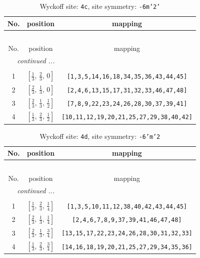 \documentclass[fleqn,8pt]{jsarticle}
\begin{document}
\renewcommand{\arraystretch}{1.2}
\begin{longtable}{ccc}
\caption{Wyckoff site: {\tt 4c}, site symmetry: {\tt -6m'2'}}
 \\
 \hline \hline
No. & position & mapping \\ \hline \endfirsthead

\multicolumn{2}{l}{\tablename\ \thetable{}} \\
 \hline \hline
No. & position & mapping \\ \hline \endhead

 \hline \hline
\multicolumn{2}{r}{\footnotesize\it continued ...} \\ \endfoot

 \hline \hline
\multicolumn{2}{r}{} \\ \endlastfoot

1 & $\left[ \frac{1}{3},\, \frac{2}{3},\, 0 \right]$ & {\tt [1,3,5,14,16,18,34,35,36,43,44,45]} \\ \hline
2 & $\left[ \frac{2}{3},\, \frac{1}{3},\, 0 \right]$ & {\tt [2,4,6,13,15,17,31,32,33,46,47,48]} \\ \hline
3 & $\left[ \frac{2}{3},\, \frac{1}{3},\, \frac{1}{2} \right]$ & {\tt [7,8,9,22,23,24,26,28,30,37,39,41]} \\ \hline
4 & $\left[ \frac{1}{3},\, \frac{2}{3},\, \frac{1}{2} \right]$ & {\tt [10,11,12,19,20,21,25,27,29,38,40,42]} \\
\end{longtable}
\renewcommand{\arraystretch}{1.2}
\begin{longtable}{ccc}
\caption{Wyckoff site: {\tt 4d}, site symmetry: {\tt -6'm'2}}
 \\
 \hline \hline
No. & position & mapping \\ \hline \endfirsthead

\multicolumn{2}{l}{\tablename\ \thetable{}} \\
 \hline \hline
No. & position & mapping \\ \hline \endhead

 \hline \hline
\multicolumn{2}{r}{\footnotesize\it continued ...} \\ \endfoot

 \hline \hline
\multicolumn{2}{r}{} \\ \endlastfoot

1 & $\left[ \frac{1}{3},\, \frac{2}{3},\, \frac{1}{4} \right]$ & {\tt [1,3,5,10,11,12,38,40,42,43,44,45]} \\ \hline
2 & $\left[ \frac{2}{3},\, \frac{1}{3},\, \frac{1}{4} \right]$ & {\tt [2,4,6,7,8,9,37,39,41,46,47,48]} \\ \hline
3 & $\left[ \frac{2}{3},\, \frac{1}{3},\, \frac{3}{4} \right]$ & {\tt [13,15,17,22,23,24,26,28,30,31,32,33]} \\ \hline
4 & $\left[ \frac{1}{3},\, \frac{2}{3},\, \frac{3}{4} \right]$ & {\tt [14,16,18,19,20,21,25,27,29,34,35,36]} \\
\end{longtable}
\end{document}
